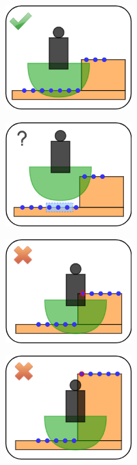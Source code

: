 \begin{figure}[ht]
    \captionsetup[subfigure]{justification=centering}
    \centering
    \begin{subfigure}[t]{.35\linewidth}
    \includegraphics[width=\textwidth, height=4cm]{Figures/Chapter_LEAS/approx0.png}
    \caption{\label{fig:approximation_validity_0}}
    \end{subfigure}
    \begin{subfigure}[t]{.35\linewidth}
    \includegraphics[width=\textwidth, height=4cm]{Figures/Chapter_LEAS/approx1.png}
    \caption{\label{fig:approximation_validity_1}}
    \end{subfigure}
    \begin{subfigure}[t]{.35\linewidth}
    \includegraphics[width=\textwidth, height=4cm]{Figures/Chapter_LEAS/approx2.png}
    \caption{\label{fig:approximation_validity_2}}
    \end{subfigure}
    \begin{subfigure}[t]{.35\linewidth}
    \includegraphics[width=\textwidth, height=4cm]{Figures/Chapter_LEAS/approx3.png}

\end{subfigure}
\end{figure}
